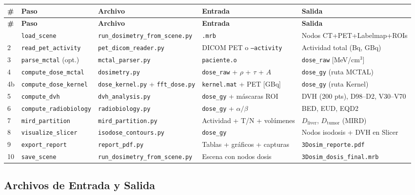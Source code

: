 \documentclass[12pt,a4paper]{article}
\begin{document}
\begin{longtable}{p{0.5cm} p{2.5cm} p{3cm} p{4cm} p{4cm}}
\toprule
\textbf{\#} & \textbf{Paso} & \textbf{Archivo} & \textbf{Entrada} & \textbf{Salida} \\
\midrule
\endfirsthead
\toprule
\textbf{\#} & \textbf{Paso} & \textbf{Archivo} & \textbf{Entrada} & \textbf{Salida} \\
\midrule
\endhead
\bottomrule
\endfoot
1 & \texttt{load\_scene} & \texttt{run\_dosimetry\_from\_scene.py} & \texttt{.mrb} & Nodos CT+PET+Labelmap+ROIs \\
2 & \texttt{read\_pet\_activity} & \texttt{pet\_dicom\_reader.py} & DICOM PET o \texttt{--activity} & Actividad total (Bq, GBq) \\
3 & \texttt{parse\_mctal} (opt.) & \texttt{mctal\_parser.py} & \texttt{paciente.o} & \texttt{dose\_raw} [MeV/cm$^3$] \\
4 & \texttt{compute\_dose\_mctal} & \texttt{dosimetry.py} & \texttt{dose\_raw} + $\rho$ + $\tau$ + $A$ & \texttt{dose\_gy} (ruta MCTAL) \\
4b & \texttt{compute\_dose\_kernel} & \texttt{dose\_kernel.py} + \texttt{fft\_dose.py} & \texttt{kernel.mat} + PET [GBq] & \texttt{dose\_gy} (ruta Kernel) \\
5 & \texttt{compute\_dvh} & \texttt{dvh\_analysis.py} & \texttt{dose\_gy} + máscaras ROI & DVH (200 pts), D98--D2, V30--V70 \\
6 & \texttt{compute\_radiobiology} & \texttt{radiobiology.py} & \texttt{dose\_gy} + $\alpha/\beta$ & BED, EUD, EQD2 \\
7 & \texttt{mird\_partition} & \texttt{mird\_partition.py} & Actividad + T/N + volúmenes & $D_{\text{liver}}$, $D_{\text{tumor}}$ (MIRD) \\
8 & \texttt{visualize\_slicer} & \texttt{isodose\_contours.py} & \texttt{dose\_gy} & Nodos isodosis + DVH en Slicer \\
9 & \texttt{export\_report} & \texttt{report\_pdf.py} & Tablas + gráficos + capturas & \texttt{3Dosim\_reporte.pdf} \\
10 & \texttt{save\_scene} & \texttt{run\_dosimetry\_from\_scene.py} & Escena con nodos dosis & \texttt{3Dosim\_dosis\_final.mrb} \\
\end{longtable}

\subsection{Archivos de Entrada y Salida}
\end{document}
